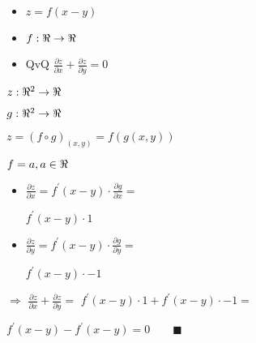 \documentclass[../practica_04.tex]{subfiles}
\begin{document}
    \begin{itemize}
        \item $ z = f(x-y) $
        \item $ f: \real \to \real$
        \item QvQ $\frac{\partial z}{\partial x} + \frac{\partial z}{\partial y} = 0$
    \end{itemize}

        $ z : \real^2 \to \real $

        $ g : \real^2 \to \real $

        $ z = (f \circ g)_{(x,y)} = f(g(x,y)) $

        $ f = a, a \in \real $

        \begin{itemize}
            \item $ \frac{\partial z}{\partial x} = f^\prime(x-y) \cdot \frac{\partial g}{\partial x} = $

            $ f^{\prime}(x-y) \cdot 1 $
            \item $ \frac{\partial z}{\partial y} = f^\prime(x-y) \cdot \frac{\partial g}{\partial y} = $

            $ f^{\prime}(x-y) \cdot -1 $
        \end{itemize}

        $\Rightarrow$
    $\frac{\partial z}{\partial x} + \frac{\partial z}{\partial y} = $
    $ f^{\prime}(x-y) \cdot 1 + f^{\prime}(x-y) \cdot -1 = $

    $ f^{\prime}(x-y) - f^{\prime}(x-y) = 0 \qquad \blacksquare $
\end{document}
